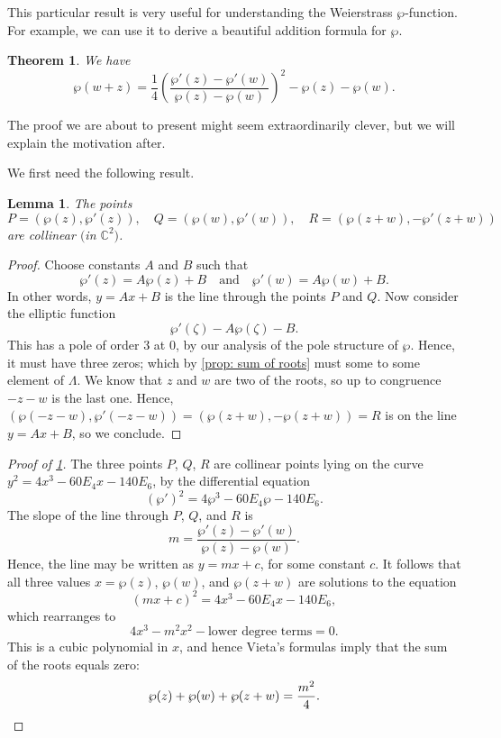 \documentclass[12pt,reqno]{amsart}
\theoremstyle{plain}
\numberwithin{equation}{section}
\newtheorem{theorem}{Theorem}[section]
\newtheorem{lemma}{Lemma}
\begin{document}
This particular result is very useful for understanding the Weierstrass $\wp$-function. For example, we can use it to derive a beautiful addition formula for $\wp$.

\begin{theorem}\label{thm: addition formula}
    We have
    \[\wp(w+z) = \frac{1}{4}\left(\frac{\wp'(z)-\wp'(w)}{\wp(z) - \wp(w)}\right)^2 - \wp(z) - \wp(w).\]
\end{theorem}
The proof we are about to present might seem extraordinarily clever, but we will explain the motivation after.

We first need the following result.
\begin{lemma}\label{lem: group law}
    The points
    \[P = (\wp (z), \wp'(z)), \quad Q = (\wp(w),\wp'(w)), \quad R = (\wp(z+w), - \wp'(z+w))\]
    are collinear $($in $\mathbb C^2)$.
\end{lemma}
\begin{proof}
    Choose constants $A$ and $B$ such that
    \[\wp'(z) = A\wp(z) + B \quad \text{and}\quad \wp'(w)  = A\wp(w) +B.\]
    In other words, $y = Ax + B$ is the line through the points $P$ and $Q$. Now consider the elliptic function
    \[\wp'(\zeta )-A\wp(\zeta) - B.\]
    This has a pole of order $3$ at $0$, by our analysis of the pole structure of $\wp$. Hence, it must have three zeros; which by \cref{prop: sum of roots} must some to some element of $\Lambda$. We know that $z$ and $w$ are two of the roots, so up to congruence $-z-w$ is the last one. Hence, $(\wp(-z-w) ,\wp'(-z-w))= (\wp(z+w),-\wp(z+w))=R$ is on the line $y=Ax + B$, so we conclude. 
\end{proof}

\begin{proof}[Proof of \cref{thm: addition formula}]
    The three points $P$, $Q$, $R$ are collinear points lying on the curve $y^2 =4x^3 - 60E_4 x - 140E_6$, by the differential equation
    \[(\wp')^2 = 4\wp^3 - 60E_4 \wp - 140 E_6.\]
    The slope of the line through $P$, $Q$, and $R$ is 
    \[m = \frac{\wp'(z)-\wp'(w)}{\wp(z) - \wp(w)}.\]
    Hence, the line may be written as $y = mx + c$, for some constant $c$. It follows that all three values $x = \wp(z)$, $\wp(w)$, and $\wp(z+w)$ are solutions to the equation
    \[(mx+c)^2 = 4x^3 - 60E_4 x - 140E_6,\]
    which rearranges to
    \[4x^3 -m^2x^2 -\text{lower degree terms} = 0.\]
    This is a cubic polynomial in $x$, and hence Vieta's formulas imply that the sum of the roots equals zero:
    \[\wp(z) + \wp(w) + \wp(z+w) = \frac{m^2}{4}.\qedhere\]
\end{proof}
\end{document}

